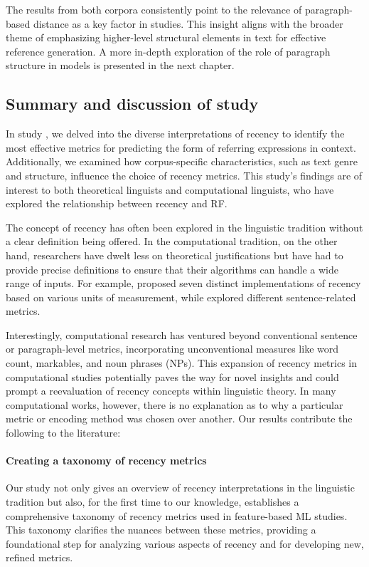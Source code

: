 The results from both corpora consistently point to the relevance of paragraph-based distance as a key factor in \context studies. This insight aligns with the broader theme of emphasizing higher-level structural elements in text for effective reference generation. A more in-depth exploration of the role of paragraph structure in \context models is presented in the next chapter.


\subsection{Summary and discussion of study \studC}\label{sec:conclusionstudyc}

In study \studC, we delved into the diverse interpretations of recency to identify the most effective metrics for predicting the form of referring expressions in context. Additionally, we examined how corpus-specific characteristics, such as text genre and structure, influence the choice of recency metrics. This study's findings are of interest to both theoretical linguists and computational linguists, who have explored the relationship between recency and RF.

The concept of recency has often been explored in the linguistic tradition without a clear definition being offered. In the computational tradition, on the other hand, researchers have dwelt less on theoretical justifications but have had to provide precise definitions to ensure that their algorithms can handle a wide range of inputs. For example, \citet{kibrik2016referential} proposed seven distinct implementations of recency based on various units of measurement, while \citet{saha2011single} explored different sentence-related metrics.

Interestingly, computational research has ventured beyond conventional sentence or paragraph-level metrics, incorporating unconventional measures like word count, markables, and noun phrases (NPs). This expansion of recency metrics in computational studies potentially paves the way for novel insights and could prompt a reevaluation of recency concepts within linguistic theory. In many computational works, however, there is no explanation as to why a particular metric or encoding method was chosen over another. Our results contribute the following to the literature:

\paragraph*{Creating a taxonomy of recency metrics} 
Our study not only gives an overview of recency interpretations in the linguistic tradition but also, for the first time to our knowledge, establishes a comprehensive taxonomy of recency metrics used in feature-based ML studies. This taxonomy clarifies the nuances between these metrics, providing a foundational step for analyzing various aspects of recency and for developing new, refined metrics. 

